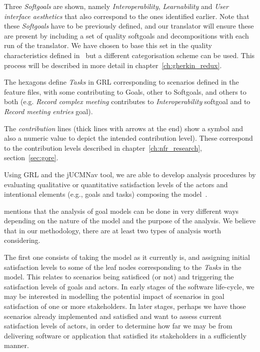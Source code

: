 \documentclass[dissertation,final]{softeng}
\begin{document}
Three \emph{Softgoals} are shown, namely \emph{Interoperability}, \emph{Learnability} and \emph{User interface aesthetics} that also correspond to the ones identified earlier. Note that these \emph{Softgoals} have to be previously defined, and our translator will ensure these are present by including a set of quality softgoals and decompositions with each run of the translator. We have chosen to base this set in the quality characteristics defined in~\citet{ieee_std_25010} but a different categorisation scheme can be used. This process will be described in more detail in chapter~\ref{ch:gherkin_redux}.

The hexagons define \emph{Tasks} in GRL corresponding to scenarios defined in the feature files, with some contributing to Goals,  other to Softgoals, and others to both (e.g. \emph{Record complex meeting} contributes to \emph{Interoperability} softgoal and to \emph{Record meeting entries} goal).

The \emph{contribution} lines (thick lines with arrows at the end) show a symbol and also a numeric value to depict the intended contribution level). These correspond to the contribution levels described in chapter~\ref{ch:nfr_research}, section~\ref{sec:gore}.

Using GRL and the jUCMNav tool, we are able to develop analysis procedures by evaluating qualitative or quantitative satisfaction levels of the actors and intentional elements (e.g., goals and tasks) composing the model~\citep{Amyot2010}.

\citet{Amyot2010} mentions that the analysis of goal models can be done in very different ways depending on the nature of the model and the purpose of the analysis. We believe that in our methodology, there are at least two types of analysis worth considering. 

The first one consists of taking the model as it currently is, and assigning initial satisfaction levels to some of the leaf nodes corresponding to the \emph{Tasks} in the model. This relates to scenarios being satisficed (or not) and triggering the satisfaction levels of goals and actors. In early stages of the software life-cycle, we may be interested in modelling the potential impact of scenarios in goal satisfaction of one or more stakeholders. In later stages, perhaps we have those scenarios already implemented and satisfied and want to assess current satisfaction levels of actors, in order to determine how far we may be from delivering software or application that satisfied its stakeholders in a sufficiently manner.
\end{document}
